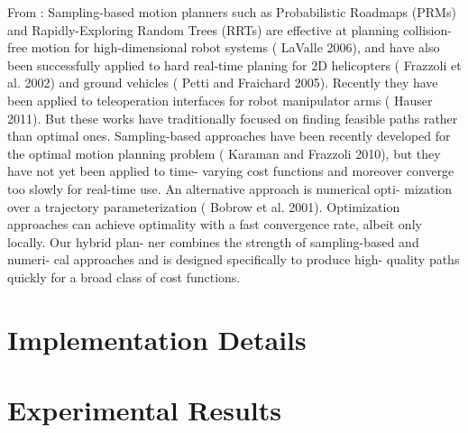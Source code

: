 From \cite{hauser2013recognition}:
Sampling-based motion planners such as Probabilistic Roadmaps (PRMs) and
Rapidly-Exploring Random Trees (RRTs) are effective at planning collision-free
motion for high-dimensional robot systems ( LaValle 2006), and have also been
successfully applied to hard real-time planing for 2D helicopters ( Frazzoli et
al. 2002) and ground vehicles ( Petti and Fraichard 2005). Recently they have
been applied to teleoperation interfaces for robot manipulator arms ( Hauser
2011). But these works have traditionally focused on finding feasible paths
rather than optimal ones.  Sampling-based approaches have been recently
developed for the optimal motion planning problem ( Karaman and Frazzoli 2010),
but they have not yet been applied to time- varying cost functions and moreover
converge too slowly for real-time use. An alternative approach is numerical
opti- mization over a trajectory parameterization ( Bobrow et al.  2001).
Optimization approaches can achieve optimality with a fast convergence rate,
albeit only locally. Our hybrid plan- ner combines the strength of
sampling-based and numeri- cal approaches and is designed specifically to
produce high- quality paths quickly for a broad class of cost functions.

\section{Implementation Details}

\section{Experimental Results}

% 
% 
